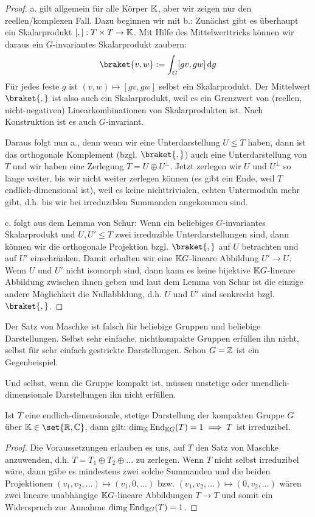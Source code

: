 \begin{proof}
a. gilt allgemein für alle Körper $\mathbb{K}$, aber wir zeigen nur den reellen/komplexen Fall. Dazu beginnen wir mit b.: Zunächst gibt es überhaupt ein Skalarprodukt $[,]: T\times T\to\mathbb{K}$. Mit Hilfe des Mittelwerttricks können wir daraus ein $G$-invariantes Skalarprodukt zaubern:
\[\braket{v,w} := \int_G [gv,gw] \dd g\]
Für jedes feste $g$ ist $(v,w) \mapsto [gv,gw]$ selbst ein Skalarprodukt. Der Mittelwert $\braket{,}$ ist also auch ein Skalarprodukt, weil es ein Grenzwert von (reellen, nicht-negativen) Linearkombinationen von Skalarprodukten ist. Nach Konstruktion ist es auch $G$-invariant.

\smallbreak
Daraus folgt nun a., denn wenn wir eine Unterdarstellung $U\leq T$ haben, dann ist das orthogonale Komplement (bzgl. $\braket{,}$) auch eine Unterdarstellung von $T$ und wir haben eine Zerlegung $T=U\oplus U^\perp$. Jetzt zerlegen wir $U$ und $U^\perp$ so lange weiter, bis wir nicht weiter zerlegen können (es gibt ein Ende, weil $T$ endlich-dimensional ist), weil es keine nichttrivialen, echten Untermoduln mehr gibt, d.h. bis wir bei irreduziblen Summanden angekommen sind.

\smallbreak
c. folgt aus dem Lemma von Schur: Wenn ein beliebiges $G$-invariantes Skalarprodukt und $U,U'\leq T$ zwei irreduzible Unterdarstellungen sind, dann können wir die orthogonale Projektion bzgl. $\braket{,}$ auf $U$ betrachten und auf $U'$ einschränken. Damit erhalten wir eine $\mathbb{K} G$-lineare Abbildung $U'\to U$. Wenn $U$ und $U'$ nicht isomorph sind, dann kann es keine bijektive $\mathbb{K} G$-lineare Abbildung zwischen ihnen geben und laut dem Lemma von Schur ist die einzige andere Möglichkeit die Nullabbldung, d.h. $U$ und $U'$ sind senkrecht bzgl. $\braket{,}$.
\end{proof}

\begin{remark}
Der Satz von Maschke ist falsch für beliebige Gruppen und beliebige Darstellungen. Selbst sehr einfache, nichtkompakte Gruppen erfüllen ihn nicht, selbst für sehr einfach gestrickte Darstellungen. Schon $G=\mathbb{Z}$ ist ein Gegenbeispiel.

Und selbst, wenn die Gruppe kompakt ist, müssen unstetige oder unendlich-dimensionale Darstellungen ihn nicht erfüllen.
\end{remark}

\begin{corollary}
Ist $T$ eine endlich-dimensionale, stetige Darstellung der kompakten Gruppe $G$ über $\IK\in\set{\IR,\IC}$, dann gilt: $\dim_{\mathbb{K}} \operatorname{End}_{\mathbb{K} G}(T) = 1 \implies T$ ist irreduzibel.
\end{corollary}
\begin{proof}
Die Voraussetzungen erlauben es uns, auf $T$ den Satz von Maschke anzuwenden, d.h. $T=T_1\oplus T_2\oplus ...$ zu zerlegen. Wenn $T$ nicht selbst irreduzibel wäre, dann gäbe es mindestens zwei solche Summanden und die beiden Projektionen $(v_1,v_2, ...) \mapsto (v_1,0,\ldots)$ bzw. $(v_1,v_2,\ldots)\mapsto (0,v_2,\ldots)$ wären zwei lineare unabhängige $\mathbb{K} G$-lineare Abbildungen $T\to T$ und somit ein Widerspruch zur Annahme $\dim_{\mathbb{K}} \operatorname{End}_{\mathbb{K} G}(T)=1$.
\end{proof}

